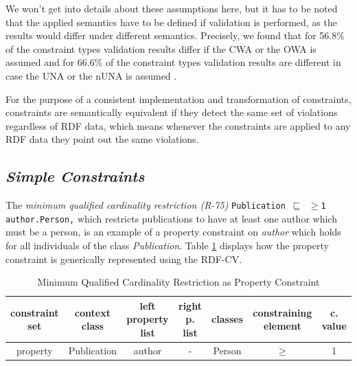 \documentclass[a4paper,fontsize=11pt]{scrartcl}
\newcommand{\ms}[1]{\texttt{#1}}
\begin{document}
We won't get into details about these assumptions here, but it has to be noted that the applied semantics have to be defined if validation is performed, as the results would differ under different semantics. Precisely, we found that for 56.8\% of the constraint types validation results differ if the CWA or the OWA is assumed 
and for 66.6\% of the constraint types validation results are different in case the UNA or the nUNA is assumed \cite{BoschNolleAcarEckert2015}.

For the purpose of a consistent implementation and transformation of constraints, constraints are semantically equivalent  
if they detect the same set of violations regardless of RDF data, 
which means whenever the constraints are applied to any RDF data they point out the same violations.


\subsection{\emph{Simple Constraints}}


The \emph{minimum qualified cardinality restriction (R-75)} {\small\ms{Publication $\sqsubseteq$ $\geq$1 author.Person,}}
which restricts publications to have at least one author which must be a person,
is an example of a property constraint on \emph{author}
which holds for all individuals of the class \emph{Publication}.
Table \ref{tab:property-constraint-cardinality-restriction} displays how the property constraint is generically represented using the RDF-CV.
\begin{table}[H]
  \scriptsize
  \sffamily
  \vspace{0cm}
	\caption{Minimum Qualified Cardinality Restriction as Property Constraint}
	\label{tab:property-constraint-cardinality-restriction}
	\centering
		\begin{tabular}{c|c|c|c|c|c|c}
      \textbf{constraint set} & \textbf{context class} & \textbf{left property list} & \textbf{right p. list} & \textbf{classes} & \textbf{constraining element} & \textbf{c. value} \\
      \hline
      property & Publication & author & - & Person & $\geq$ & 1 \\
		\end{tabular}
\end{table}

\end{document}
